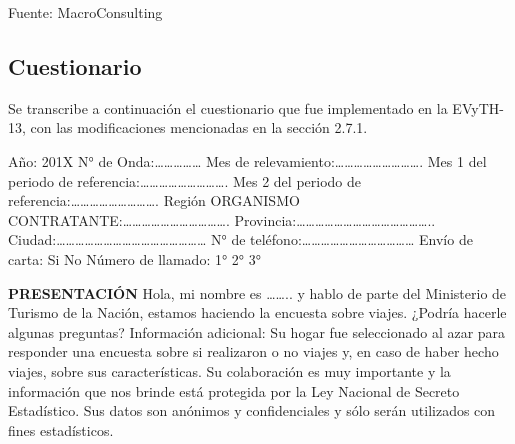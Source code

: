 \documentclass[
  openany]{book}
\begin{document}
Fuente: MacroConsulting

\hypertarget{cuestionario-1}{%
\subsection{Cuestionario}\label{cuestionario-1}}

Se transcribe a continuación el cuestionario que fue implementado en la EVyTH-13, con las modificaciones mencionadas en la sección 2.7.1.

Año: 201X
N° de Onda:\ldots\ldots\ldots\ldots\ldots{}
Mes de relevamiento:\ldots\ldots\ldots\ldots\ldots\ldots\ldots\ldots\ldots.
Mes 1 del periodo de referencia:\ldots\ldots\ldots\ldots\ldots\ldots\ldots\ldots\ldots.
Mes 2 del periodo de referencia:\ldots\ldots\ldots\ldots\ldots\ldots\ldots\ldots\ldots.
Región ORGANISMO CONTRATANTE:\ldots\ldots\ldots\ldots\ldots\ldots\ldots\ldots\ldots\ldots\ldots.
Provincia:\ldots\ldots\ldots\ldots\ldots\ldots\ldots\ldots\ldots\ldots\ldots\ldots\ldots\ldots..
Ciudad:\ldots\ldots\ldots\ldots\ldots\ldots\ldots\ldots\ldots\ldots\ldots\ldots\ldots\ldots\ldots\ldots{}
N° de teléfono:\ldots\ldots\ldots\ldots\ldots\ldots\ldots\ldots\ldots\ldots\ldots\ldots{}
Envío de carta: Si No
Número de llamado: 1° 2° 3°

\textbf{PRESENTACIÓN}
Hola, mi nombre es \ldots\ldots.. y hablo de parte del Ministerio de Turismo de la Nación, estamos haciendo la encuesta sobre viajes. ¿Podría hacerle algunas preguntas? Información adicional:
Su hogar fue seleccionado al azar para responder una encuesta sobre si realizaron o no viajes y, en caso de haber hecho viajes, sobre sus características.
Su colaboración es muy importante y la información que nos brinde está protegida por la Ley Nacional de Secreto Estadístico. Sus datos son anónimos y confidenciales y sólo serán utilizados con fines estadísticos.
\end{document}
